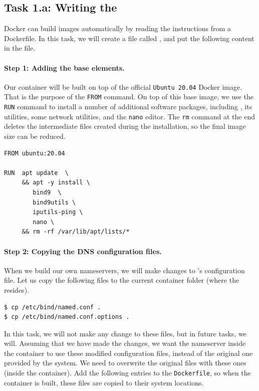 \subsection{Task 1.a: Writing the \dockerfile}

Docker can build images automatically by reading the instructions from a Dockerfile. 
In this task, we will 
create a file called \dockerfile, and put the following 
content in the file. 

\paragraph{Step 1: Adding the base elements.} Our container 
will be built on top of the official \texttt{Ubuntu 20.04} Docker image. 
That is the purpose of the \texttt{FROM} command. 
On top of this base image, we use the \texttt{RUN} command
to install a number of additional software packages, including
\bind, its utilities, some network utilities, and the \texttt{nano}
editor.
The \texttt{rm} command at the end deletes the intermediate files
created during the installation, so the final image size can be reduced. 


\begin{lstlisting}
FROM ubuntu:20.04

RUN  apt update  \
     && apt -y install \
        bind9  \
        bind9utils \
        iputils-ping \
        nano \
     && rm -rf /var/lib/apt/lists/*
\end{lstlisting}



\paragraph{Step 2: Copying the DNS configuration files.} 
When we build our own nameservers, we will make changes
to \bind's configuration file. Let us copy
the following files to the current container folder (where 
the \dockerfile resides). 

\begin{lstlisting}
$ cp /etc/bind/named.conf .
$ cp /etc/bind/named.conf.options .
\end{lstlisting}


In this task, we will not make any change to these files, but 
in future tasks, we will. Assuming that we have made 
the changes, we want the nameserver inside the container
to use these modified configuration files, instead of the original
one provided by the system. We need to overwrite the 
original files with these ones (inside the container). Add 
the following entries to the \texttt{Dockerfile}, so when
the container is built, these files are copied to their 
system locations. 


